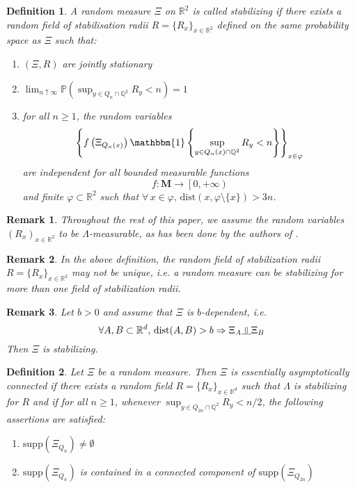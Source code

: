 \documentclass[10pt,a4paper]{amsart}
\theoremstyle{exampstyle}
\newtheorem{Definition}{Definition}
\newtheorem{Remark}{Remark}
\theoremstyle{exampnotations}
\newcommand{\indep}{\rotatebox[origin=c]{90}{$\models$}}
\begin{document}
\begin{Definition}\cite[Definition 2.3]{hirsch_continuum_2017}
\label{Def.stabilizing}
A random measure $\Xi$ on $\mathbb{R}^{2}$ is called \emph{stabilizing} if there exists a random field of stabilisation radii $R = \lbrace R_{x} \rbrace _{x \in \mathbb{R}^{2}}$ defined on the same probability space as $\Xi$ such that:
\begin{enumerate}[label = (\arabic*)]
\item $(\Xi,R)$ are jointly stationary
\item $\displaystyle \lim_{n \uparrow \infty} \mathbb{P}\left(\sup _{y \in Q_{n} \cap \mathbb{Q}^{2}} R_{y} < n\right) = 1$
\item for all $n \geq 1$, the random variables 
$$ \left\lbrace f\left(\Xi_{Q_{n}(x)}\right)\mathbbm{1}\left\lbrace \sup_{y \in Q_{n}(x) \cap \mathbb{Q}^{2}} R_{y} < n \right\rbrace \right\rbrace _{x \in \varphi}$$
are independent for all bounded measurable functions $$f : \mathbf{M} \to \left[0, +\infty \right)$$ and finite $\varphi \subset \mathbb{R}^{2}$ such that $\forall \, x \in \varphi, \, \text{dist}(x, \varphi \setminus \lbrace x \rbrace ) > 3n$.
\end{enumerate}
\end{Definition}
\begin{Remark}
Throughout the rest of this paper, we assume the random variables $(R_x)_{x \in \mathbb{R}^{2}}$ to be $\Lambda$-measurable, as has been done by the authors of \cite{hirsch_continuum_2017}.
\end{Remark}
\begin{Remark}
In the above definition, the random field of stabilization radii $R = \lbrace R_{x} \rbrace _{x \in \mathbb{R}^{2}}$ may not be unique, i.e. a random measure can be stabilizing for more than one field of stabilization radii.
\end{Remark}
\begin{Remark}
Let $b > 0$ and assume that $\Xi$ is $b$-dependent, i.e. $$\forall A,B \subset \mathbb{R}^{d}, \, \text{dist}(A,B) > b \Rightarrow \Xi_{A} \indep \Xi_{B}$$ Then $\Xi$ is stabilizing. 
\end{Remark} 

\begin{Definition}\cite[Definition 2.5]{hirsch_continuum_2017}
\label{Def.eac}
Let $\Xi$ be a random measure. Then $\Xi$ is \emph{essentially asymptotically connected} if there exists a random field $R = \lbrace R_{x} \rbrace_{x \in \mathbb{R}^{d}}$ such that $\Lambda$ is stabilizing for $R$ and if for all $n \geq 1$, whenever $\displaystyle \sup_{y \in Q_{2n} \cap \mathbb{Q}^{2}} R_{y} < n/2$, the following assertions are satisfied:
\begin{enumerate}[label = (\arabic*)]
\item $\text{supp}(\Xi_{Q_{n}}) \neq \emptyset$
\item $\text{supp}(\Xi_{Q_{n}})$ is contained in a connected component of $\text{supp}(\Xi_{Q_{2n}})$
\end{enumerate}
\end{Definition}
\end{document}
